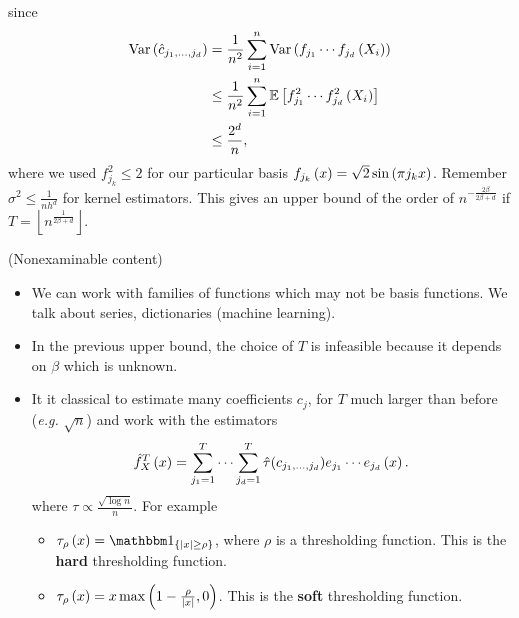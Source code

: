 since
\begin{equation*}
  \begin{split}
    \mathrm{Var}\left(\hat c_{j_1,...,j_d}\right) & = \frac{1}{n^2} \sum_{i=1}^n \mathrm{Var} \left(f_{j_1} \cdots f_{j_d} \left(X_i\right)\right)       \\
                                  & \leq \frac{1}{n^2} \sum_{i=1}^n \mathbb{E} \left[f_{j_1}^2 \cdots f_{j_d}^2 \left(X_i\right)\right] \\
                                  & \leq \frac{2^d}{n},
  \end{split}
\end{equation*}
where we used $f_{j_k}^2 \leq 2$ for our particular basis $f_{j_k}\left(x\right) = \sqrt{2}\sin\left(\pi j_k x\right)$.
Remember $\sigma^2 \leq \frac{1}{nh^d}$ for kernel estimators.
This gives an upper bound of the order of $n^{-\frac{2\beta}{2\beta +d }}$ if $T = \left\lfloor n^{\frac{1}{2\beta + d}}\right\rfloor$.
\begin{remark}(Nonexaminable content)
  \begin{itemize}
    \item We can work with families of functions which may not be basis functions. We
          talk about series, dictionaries (machine learning).
    \item In the previous upper bound, the choice of $T$ is infeasible because it depends
          on $\beta$ which is unknown.
    \item It it classical to estimate many coefficients $c_j$, for $T$ much larger than
          before (\emph{e.g.} $\sqrt{n}$) and work with the estimators\begin{equation*}
            \hat f_X^T\left(x\right) = \sum_{j_1=1}^T \cdots \sum_{j_d=1}^T \hat \tau(c_{j_1,...,j_d}) e_{j_1}\cdots e_{j_d}\left(x\right).
          \end{equation*}
          where $\tau \propto \frac{\sqrt{\log n}}{n}$. For example
          \begin{itemize}
            \item $\tau_\rho \pa{x} = \one_{\set{\abs{x}\geq \rho}}$, where $\rho$ is a thresholding function. This is the \textbf{hard} thresholding function.
            \item $\tau_\rho \left(x\right) = x \max \left(1-\frac{\rho}{\left| x\right|},0\right)$. This is the \textbf{soft} thresholding function.
          \end{itemize}
  \end{itemize}

\end{remark}